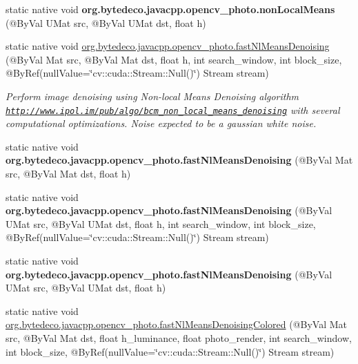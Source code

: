 \begin{DoxyCompactItemize}
static native void {\bfseries org.\+bytedeco.\+javacpp.\+opencv\+\_\+photo.\+non\+Local\+Means} (@By\+Val U\+Mat src, @By\+Val U\+Mat dst, float h)
\item 
static native void \hyperlink{group__photo__denoise_gaec9cf0273a944c7f99b00f2766c93876}{org.\+bytedeco.\+javacpp.\+opencv\+\_\+photo.\+fast\+Nl\+Means\+Denoising} (@By\+Val Mat src, @By\+Val Mat dst, float h, int search\+\_\+window, int block\+\_\+size, @By\+Ref(null\+Value=\char`\"{}cv\+::cuda\+::\+Stream\+::\+Null()\char`\"{}) Stream stream)
\begin{DoxyCompactList}\small\item\em Perform image denoising using Non-\/local Means Denoising algorithm \href{http://www.ipol.im/pub/algo/bcm_non_local_means_denoising}{\tt http\+://www.\+ipol.\+im/pub/algo/bcm\+\_\+non\+\_\+local\+\_\+means\+\_\+denoising} with several computational optimizations. Noise expected to be a gaussian white noise. \end{DoxyCompactList}\item 
\mbox{\label{group__photo__denoise_ga68a434ab0d9287b6eeae7fbc7c3e0d6c}} 
static native void {\bfseries org.\+bytedeco.\+javacpp.\+opencv\+\_\+photo.\+fast\+Nl\+Means\+Denoising} (@By\+Val Mat src, @By\+Val Mat dst, float h)
\item 
\mbox{\label{group__photo__denoise_ga9c0d4fb94887911fc4909be30a0e33e2}} 
static native void {\bfseries org.\+bytedeco.\+javacpp.\+opencv\+\_\+photo.\+fast\+Nl\+Means\+Denoising} (@By\+Val U\+Mat src, @By\+Val U\+Mat dst, float h, int search\+\_\+window, int block\+\_\+size, @By\+Ref(null\+Value=\char`\"{}cv\+::cuda\+::\+Stream\+::\+Null()\char`\"{}) Stream stream)
\item 
\mbox{\label{group__photo__denoise_ga84e1a3aa4089b142907ba8d2b6f4640a}} 
static native void {\bfseries org.\+bytedeco.\+javacpp.\+opencv\+\_\+photo.\+fast\+Nl\+Means\+Denoising} (@By\+Val U\+Mat src, @By\+Val U\+Mat dst, float h)
\item 
static native void \hyperlink{group__photo__denoise_gacd4a3b55d6d09a6c95d4cc53f633968c}{org.\+bytedeco.\+javacpp.\+opencv\+\_\+photo.\+fast\+Nl\+Means\+Denoising\+Colored} (@By\+Val Mat src, @By\+Val Mat dst, float h\+\_\+luminance, float photo\+\_\+render, int search\+\_\+window, int block\+\_\+size, @By\+Ref(null\+Value=\char`\"{}cv\+::cuda\+::\+Stream\+::\+Null()\char`\"{}) Stream stream)

\end{DoxyCompactItemize}
